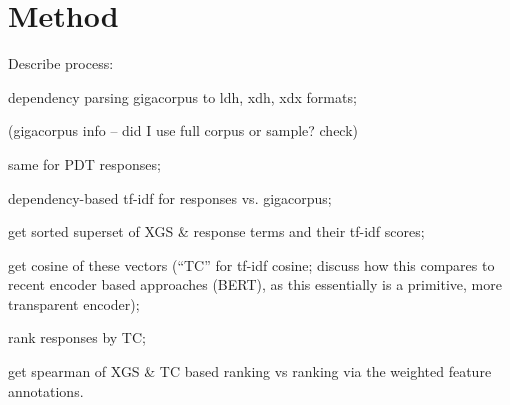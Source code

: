 \chapter{Method}
\label{chap:method}
Describe process:

dependency parsing gigacorpus to ldh, xdh, xdx formats;

(gigacorpus info -- did I use full corpus or sample? check)

same for PDT responses;

dependency-based tf-idf for responses vs. gigacorpus;

get sorted superset of XGS \& response terms and their tf-idf scores;

get cosine of these vectors (``TC'' for tf-idf cosine; discuss how this compares to recent encoder based approaches (BERT), as this essentially is a primitive, more transparent encoder);

rank responses by TC;

get spearman of XGS \& TC based ranking vs ranking via the weighted feature annotations.
